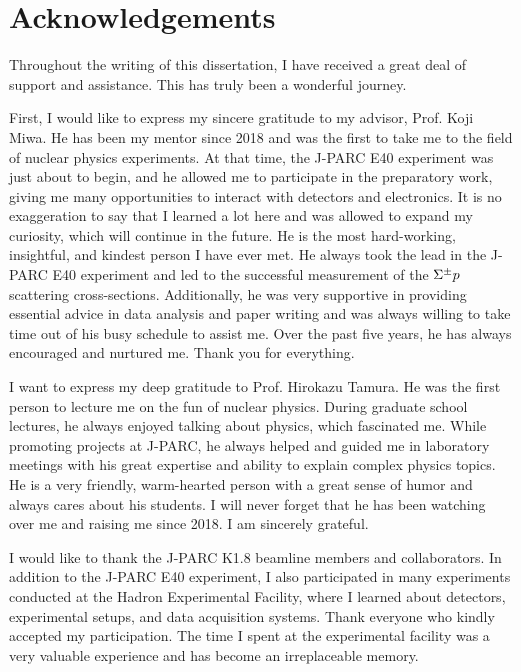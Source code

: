%

\chapter{Acknowledgements}

Throughout the writing of this dissertation, I have received a great deal of support and assistance. This has truly been a wonderful journey.

First, I would like to express my sincere gratitude to my advisor, Prof. Koji Miwa. He has been my mentor since 2018 and was the first to take me to the field of nuclear physics experiments. At that time, the J-PARC E40 experiment was just about to begin, and he allowed me to participate in the preparatory work, giving me many opportunities to interact with detectors and electronics. It is no exaggeration to say that I learned a lot here and was allowed to expand my curiosity, which will continue in the future. He is the most hard-working, insightful, and kindest person I have ever met. He always took the lead in the J-PARC E40 experiment and led to the successful measurement of the $\Sigma^{\pm}p$ scattering cross-sections. Additionally, he was very supportive in providing essential advice in data analysis and paper writing and was always willing to take time out of his busy schedule to assist me. Over the past five years, he has always encouraged and nurtured me. Thank you for everything.

I want to express my deep gratitude to Prof. Hirokazu Tamura. He was the first person to lecture me on the fun of nuclear physics. During graduate school lectures, he always enjoyed talking about physics, which fascinated me. While promoting projects at J-PARC, he always helped and guided me in laboratory meetings with his great expertise and ability to explain complex physics topics. He is a very friendly, warm-hearted person with a great sense of humor and always cares about his students. I will never forget that he has been watching over me and raising me since 2018. I am sincerely grateful.

I would like to thank the J-PARC K1.8 beamline members and collaborators. In addition to the J-PARC E40 experiment, I also participated in many experiments conducted at the Hadron Experimental Facility, where I learned about detectors, experimental setups, and data acquisition systems. Thank everyone who kindly accepted my participation. The time I spent at the experimental facility was a very valuable experience and has become an irreplaceable memory.


